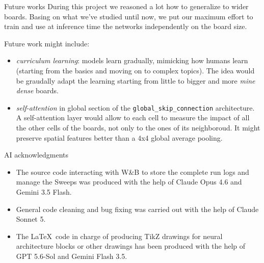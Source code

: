 \begin{frame}{Future works}
  During this project we reasoned a lot how to generalize
  to wider boards. Basing on what we've studied until now, we put our maximum
  effort to train and use at inference time the networks independently on the board size.

  Future work might include:
  \begin{itemize}
    \item \textit{curriculum learning}:
          models learn gradually, mimicking how humans learn
          (starting from the basics and moving on to complex topics). The idea
          would be graudally adapt the learning starting from little to bigger
          and more \textit{mine dense} boards.
    \item \textit{self-attention} in global section of the \texttt{global\_skip\_connection}
          architecture. A self-attention layer would allow to each cell to measure
          the impact of all the other cells of the boards, not only to the ones of its neighboroud.
          It might preserve spatial features better than a 4x4 global average pooling.
  \end{itemize}


\end{frame}
\begin{frame}{AI acknowledgments}
  \begin{itemize}
    \item The source code interacting with W\&B to store the complete run logs and manage the Sweeps was produced with the help of Claude Opus 4.6 and Gemini 3.5 Flash.
    \item General code cleaning and bug fixing was carried out with the help of Claude Sonnet 5.
    \item The \LaTeX~code in charge of producing TikZ drawings for neural architecture blocks or other drawings has been produced with the help of GPT 5.6-Sol and Gemini Flash 3.5.
  \end{itemize}
\end{frame}
